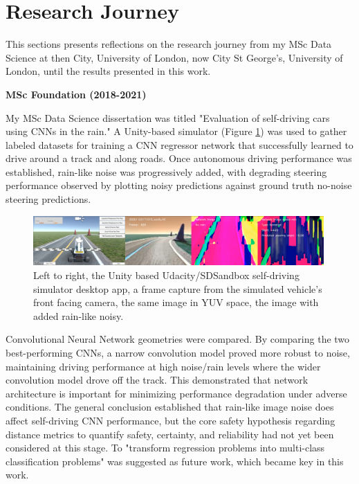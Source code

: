 \section{Research Journey}
\label{intro:research_journey}
This sections presents reflections on the research journey from my MSc Data Science at then City, University of London, now City St George's, University of London, until the results presented in this work.

\textbf{MSc Foundation (2018-2021)}

My MSc Data Science dissertation was titled "Evaluation of self-driving cars using CNNs in the rain." A Unity-based simulator (Figure \ref{fig:UdacitySdSandboxSim})  was used to gather labeled datasets for training a CNN regressor network that successfully learned to drive around a track and along roads. Once autonomous driving performance was established, rain-like noise was progressively added, with degrading steering performance observed by plotting noisy predictions against ground truth no-noise steering predictions.

\begin{figure}[h]
\centering
\includegraphics[width=0.99\textwidth]{Figures/Methods/UdacitySdSandboxSim.png}
\caption{Left to right, the Unity based Udacity/SDSandbox self-driving simulator desktop app, a frame capture from the simulated vehicle's front facing camera, the same image in YUV space, the image with added rain-like noisy.}
\label{fig:UdacitySdSandboxSim}
\end{figure}

Convolutional Neural Network geometries were compared.
By comparing the two best-performing CNNs, a narrow convolution model proved more robust to noise, maintaining driving performance at high noise/rain levels where the wider convolution model drove off the track. This demonstrated that network architecture is important for minimizing performance degradation under adverse conditions.
The general conclusion established that rain-like image noise does affect self-driving CNN performance, but the core safety hypothesis regarding distance metrics to quantify safety, certainty, and reliability had not yet been considered at this stage.
To "transform regression problems into multi-class classification problems" was suggested as future work, which became key in this work. 

